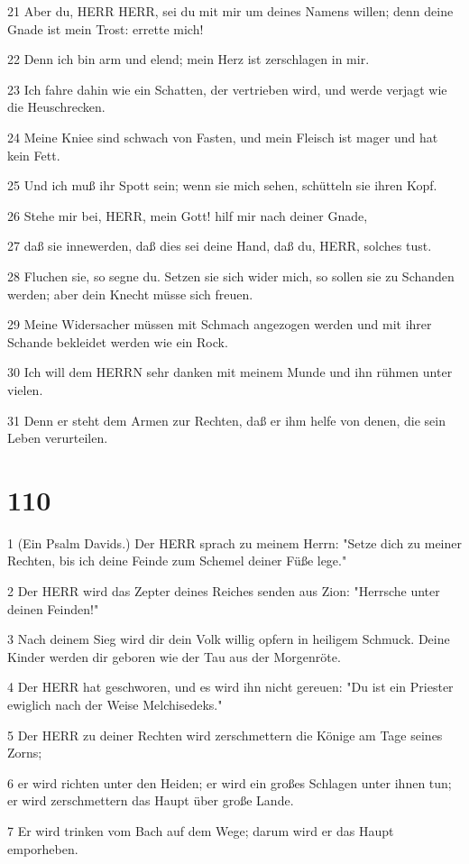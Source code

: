 \par 21 Aber du, HERR HERR, sei du mit mir um deines Namens willen; denn deine Gnade ist mein Trost: errette mich!
\par 22 Denn ich bin arm und elend; mein Herz ist zerschlagen in mir.
\par 23 Ich fahre dahin wie ein Schatten, der vertrieben wird, und werde verjagt wie die Heuschrecken.
\par 24 Meine Kniee sind schwach von Fasten, und mein Fleisch ist mager und hat kein Fett.
\par 25 Und ich muß ihr Spott sein; wenn sie mich sehen, schütteln sie ihren Kopf.
\par 26 Stehe mir bei, HERR, mein Gott! hilf mir nach deiner Gnade,
\par 27 daß sie innewerden, daß dies sei deine Hand, daß du, HERR, solches tust.
\par 28 Fluchen sie, so segne du. Setzen sie sich wider mich, so sollen sie zu Schanden werden; aber dein Knecht müsse sich freuen.
\par 29 Meine Widersacher müssen mit Schmach angezogen werden und mit ihrer Schande bekleidet werden wie ein Rock.
\par 30 Ich will dem HERRN sehr danken mit meinem Munde und ihn rühmen unter vielen.
\par 31 Denn er steht dem Armen zur Rechten, daß er ihm helfe von denen, die sein Leben verurteilen.

\chapter{110}

\par 1 (Ein Psalm Davids.) Der HERR sprach zu meinem Herrn: "Setze dich zu meiner Rechten, bis ich deine Feinde zum Schemel deiner Füße lege."
\par 2 Der HERR wird das Zepter deines Reiches senden aus Zion: "Herrsche unter deinen Feinden!"
\par 3 Nach deinem Sieg wird dir dein Volk willig opfern in heiligem Schmuck. Deine Kinder werden dir geboren wie der Tau aus der Morgenröte.
\par 4 Der HERR hat geschworen, und es wird ihn nicht gereuen: "Du ist ein Priester ewiglich nach der Weise Melchisedeks."
\par 5 Der HERR zu deiner Rechten wird zerschmettern die Könige am Tage seines Zorns;
\par 6 er wird richten unter den Heiden; er wird ein großes Schlagen unter ihnen tun; er wird zerschmettern das Haupt über große Lande.
\par 7 Er wird trinken vom Bach auf dem Wege; darum wird er das Haupt emporheben.

